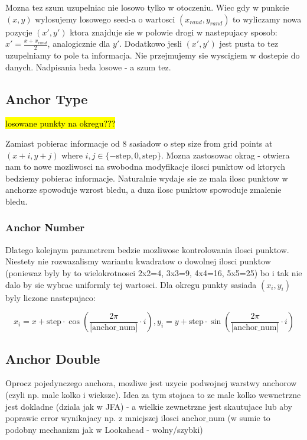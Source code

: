 \documentclass[format=acmsmall,screen,review,authordraft,nonacm]{acmart}
\begin{document}
Mozna tez szum uzupelniac nie losowo tylko w otoczeniu. Wiec gdy w punkcie
$(x,y)$ wylosujemy losowego seed-a o wartosci $(x_{rand}, y_{rand})$ to
wyliczamy nowa pozycje $(x', y')$ ktora znajduje sie
w polowie drogi w nastepujacy sposob: $x' = \frac{x+x_{rand}}{2}$, analogicznie
dla $y'$. Dodatkowo jesli $(x', y')$ jest pusta to tez uzupelniamy to pole ta
informacja. Nie przejmujemy sie wyscigiem w dostepie do danych. Nadpisania beda
losowe - a szum tez.

\subsection{Anchor Type} %

\hl{losowane punkty na okregu???}

Zamiast pobierac informacje od 8 sasiadow o step size from grid points at
$(x+i, y+j)$ where $i, j \in \{-\text{step}, 0, \text{step}\}$. Mozna zastosowac
okrag - otwiera nam to nowe mozliwosci na swobodna modyfikacje ilosci punktow od
ktorych bedziemy pobierac informacje. Naturalnie wydaje sie ze mala ilosc
punktow w anchorze spowoduje wzrost bledu, a duza ilosc punktow spowoduje
zmalenie bledu.

\subsubsection{Anchor Number} %

Dlatego kolejnym parametrem bedzie mozliwosc kontrolowania ilosci punktow.
Niestety nie rozwazalismy wariantu kwadratow o dowolnej ilosci punktow (poniewaz
byly by to wielokrotnosci 2x2=4, 3x3=9, 4x4=16, 5x5=25) bo i tak nie dalo by sie
wybrac uniformly tej wartosci. Dla okregu punkty sasiada $(x_i, y_i)$ byly liczone
nastepujaco:
   
$$
x_i = x + \text{step} \cdot \cos( \frac{2\pi}{\text{[anchor\_num]}} \cdot i ),
y_i = y + \text{step} \cdot \sin( \frac{2\pi}{\text{[anchor\_num]}} \cdot i )
$$

\subsection{Anchor Double} %

Oprocz pojedynczego anchora, mozliwe jest uzycie podwojnej warstwy anchorow
(czyli np. male kolko i wieksze). Idea za tym stojaca to ze male kolko
wewnetrzne jest dokladne (dziala jak w JFA) - a wielkie zewnetrzne
jest skautujace lub aby poprawic error wynikajacy np. z mniejszej ilosci
$\text{anchor\_num}$ (w sumie to podobny mechanizm jak w Lookahead - wolny/szybki)
\end{document}
